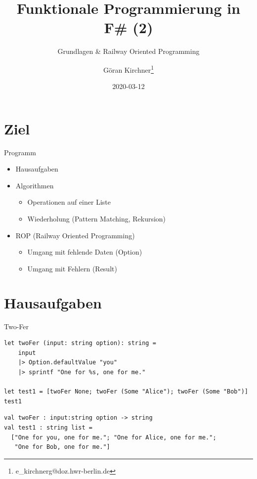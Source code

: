 \documentclass[t]{beamer}
\author{Göran Kirchner\thanks{e\_kirchnerg@doz.hwr-berlin.de}}
\date{2020-03-12}
\title{Funktionale Programmierung in F\# (2)}
\subtitle{Grundlagen \& Railway Oriented Programming}
\begin{document}
\maketitle

\section{Ziel }
\label{sec:orgd6466c9}

\begin{frame}[label={sec:orgbe70d47}]{Programm}
\begin{itemize}
\item Hausaufgaben
\item Algorithmen
\begin{itemize}
\item Operationen auf einer Liste
\item Wiederholung (Pattern Matching, Rekursion)
\end{itemize}
\item ROP (Railway Oriented Programming)
\begin{itemize}
\item Umgang mit fehlende Daten (Option)
\item Umgang mit Fehlern (Result)
\end{itemize}
\end{itemize}
\end{frame}

\section{Hausaufgaben }
\label{sec:org0e8c681}

\begin{frame}[label={sec:org888bcf8},fragile]{Two-Fer}
 \begin{verbatim}
let twoFer (input: string option): string = 
    input 
    |> Option.defaultValue "you"
    |> sprintf "One for %s, one for me."

let test1 = [twoFer None; twoFer (Some "Alice"); twoFer (Some "Bob")]
test1
\end{verbatim}

\begin{verbatim}
val twoFer : input:string option -> string
val test1 : string list =
  ["One for you, one for me."; "One for Alice, one for me.";
   "One for Bob, one for me."]
\end{verbatim}
\end{frame}
\end{document}
